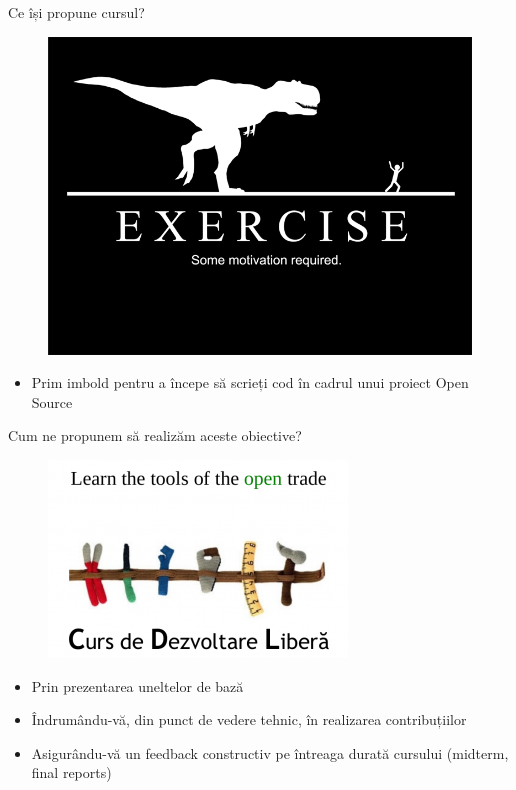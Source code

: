 \documentclass{beamer}
\begin{document}
\begin{frame}{Ce își propune cursul?}
  \begin{figure}
    \includegraphics[scale=0.3]{img/motivation.png}
  \end{figure}

  \begin{itemize}
  \item Prim imbold pentru a începe să scrieți cod în cadrul unui proiect Open
  Source
  \end{itemize}
\end{frame}

\begin{frame}{Cum ne propunem să realizăm aceste obiective?}
  \begin{figure}
    \includegraphics[scale=0.4]{img/open_trade.png}
  \end{figure}

  \begin{itemize} %
  \pause
  \item Prin prezentarea uneltelor de bază
  \pause
  \item Îndrumându-vă, din punct de vedere tehnic, în realizarea
  contribuțiilor
  \pause
  \item Asigurându-vă un feedback constructiv pe întreaga durată cursului
  (midterm, final reports)
  \end{itemize}
\end{frame}
\end{document}
